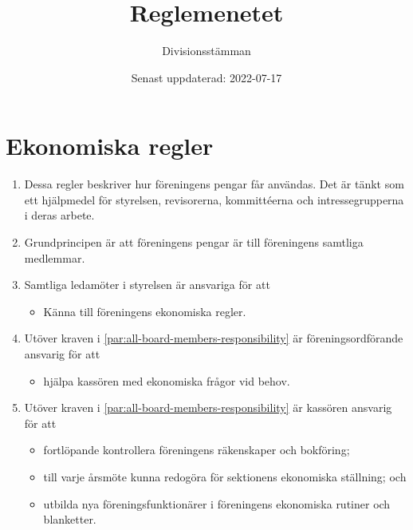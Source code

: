 \documentclass{dvd}
\begin{document}
	\title{Reglemenetet}
	\author{Divisionsstämman}
	\date{Senast uppdaterad: 2022-07-17}

\section{Ekonomiska regler}

	\begin{enumerate}[label=\arabic* §, ref=\arabic*]
		\item Dessa regler beskriver hur föreningens pengar får användas.
		Det är tänkt som ett hjälpmedel för styrelsen, revisorerna, kommittéerna och intressegrupperna i deras arbete.

		\item Grundprincipen är att föreningens pengar är till föreningens samtliga medlemmar.

		\item Samtliga ledamöter i styrelsen är ansvariga för att

		\begin{itemize}
			\item Känna till föreningens ekonomiska regler.
		\end{itemize}
		\label{par:all-board-members-responsibility}

		\item Utöver kraven i \ref{par:all-board-members-responsibility} är föreningsordförande ansvarig för att

		\begin{itemize}
			\item hjälpa kassören med ekonomiska frågor vid behov.
		\end{itemize}

		\item Utöver kraven i \ref{par:all-board-members-responsibility} är kassören ansvarig för att

		\begin{itemize}

			\item fortlöpande kontrollera föreningens räkenskaper och bokföring;

			\item till varje årsmöte kunna redogöra för sektionens ekonomiska ställning; och

			\item utbilda nya föreningsfunktionärer i föreningens ekonomiska rutiner och blanketter.

		\end{itemize}


\end{enumerate}
\end{document}
